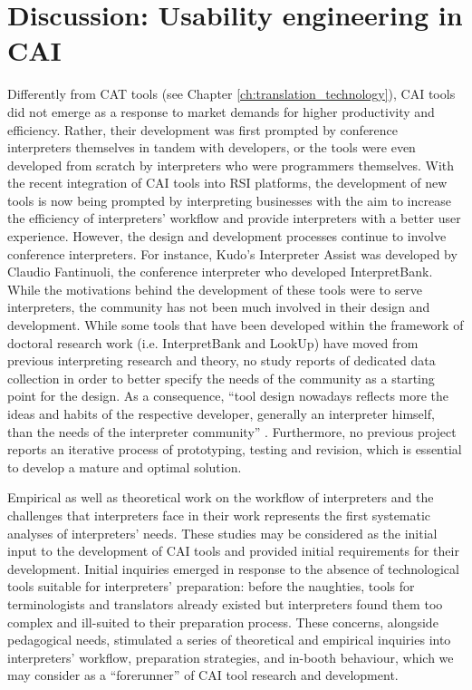 \section{Discussion: Usability engineering in CAI}


Differently from CAT tools (see Chapter \ref{ch:translation_technology}), CAI tools did not emerge as a response to market demands for higher productivity and efficiency. Rather, their development was first prompted by conference interpreters themselves in tandem with developers, or the tools were even developed from scratch by interpreters who were programmers themselves. With the recent integration of CAI tools into RSI platforms, the development of new tools is now being prompted by interpreting businesses with the aim to increase the efficiency of interpreters’ workflow and provide interpreters with a better user experience. However, the design and development processes continue to involve conference interpreters. For instance, Kudo’s Interpreter Assist was developed by Claudio Fantinuoli, the conference interpreter who developed InterpretBank. While the motivations behind the development of these tools were to serve interpreters, the community has not been much involved in their design and development. While some tools that have been developed within the framework of doctoral research work (i.e. InterpretBank and LookUp) have moved from previous interpreting research and theory, no study reports of dedicated data collection in order to better specify the needs of the community as a starting point for the design. As a consequence, ``tool design nowadays reflects more the ideas and habits of the respective developer, generally an interpreter himself, than the needs of the interpreter community'' \citep[164]{fantinuoli2018b}. Furthermore, no previous project reports an iterative process of prototyping, testing and revision, which is essential to develop a mature and optimal solution.

Empirical as well as theoretical work on the workflow of interpreters and the challenges that interpreters face in their work represents the first systematic analyses of interpreters’ needs. These studies may be considered as the initial input to the development of CAI tools and provided initial requirements for their development. Initial inquiries emerged in response to the absence of technological tools suitable for interpreters’ preparation: before the naughties, tools for terminologists and translators already existed but interpreters found them too complex and ill-suited to their preparation process. These concerns, alongside pedagogical needs, stimulated a series of theoretical and empirical inquiries into interpreters’ workflow, preparation strategies, and in-booth behaviour, which we may consider as a “forerunner” of CAI tool research and development.

